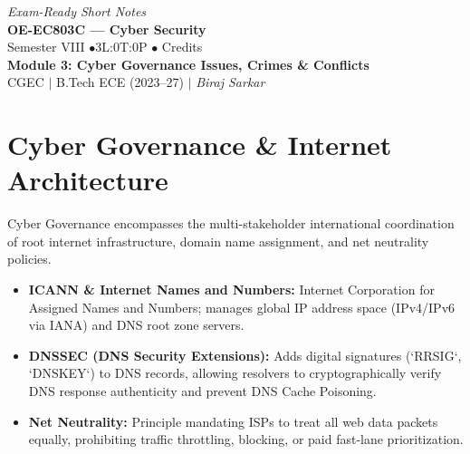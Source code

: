 \documentclass[12pt,a4paper]{article}
\begin{document}
\begin{center}
  \hfill \textit{Exam-Ready Short Notes} \\
  \vspace{6pt}
  {\LARGE\bfseries\color{myred} OE-EC803C --- Cyber Security}\\[5pt]
  {\normalsize\color{mydark} Semester VIII \quad$\bullet$\quad 3L:0T:0P \quad$\bullet$ Credits}\\[3pt]
  {\normalsize\color{myteal}\textbf{Module 3: Cyber Governance Issues, Crimes \& Conflicts}}\\[3pt]
  {\small\color{mydark} CGEC \;$|$\; B.Tech ECE (2023--27) \;$|$\; \textit{Biraj Sarkar}}
\end{center}
\vspace{2pt}
\noindent{\color{myred}\rule{\linewidth}{1.5pt}}
\vspace{2pt}

\hypersetup{linkcolor=mydark}
\tableofcontents
\hypersetup{linkcolor=myteal}
\newpage

\section{Cyber Governance \& Internet Architecture}

Cyber Governance encompasses the multi-stakeholder international coordination of root internet infrastructure, domain name assignment, and net neutrality policies.

\begin{tcolorbox}[defbox, title={\textbf{Definition: ICANN, DNSSEC \& Net Neutrality}}]
\begin{itemize}[leftmargin=*, itemsep=3pt]
  \item \textbf{ICANN \& Internet Names and Numbers:} Internet Corporation for Assigned Names and Numbers; manages global IP address space (IPv4/IPv6 via IANA) and DNS root zone servers.
  \item \textbf{DNSSEC (DNS Security Extensions):} Adds digital signatures (`RRSIG`, `DNSKEY`) to DNS records, allowing resolvers to cryptographically verify DNS response authenticity and prevent DNS Cache Poisoning.
  \item \textbf{Net Neutrality:} Principle mandating ISPs to treat all web data packets equally, prohibiting traffic throttling, blocking, or paid fast-lane prioritization.
\end{itemize}
\end{tcolorbox}
\end{document}
